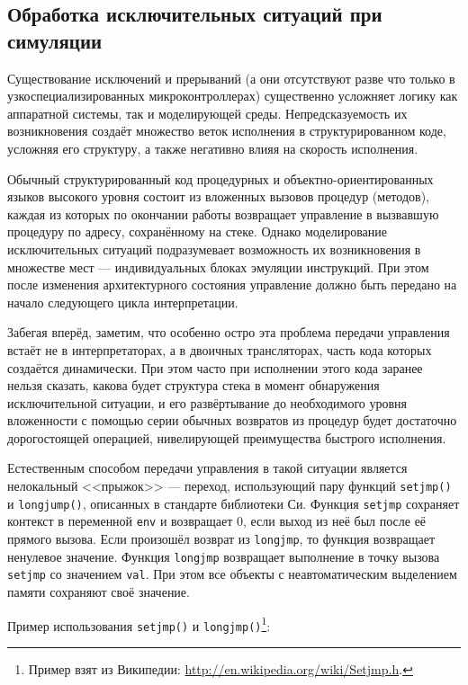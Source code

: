 \subsection[Обработка исключительных ситуаций]{Обработка исключительных ситуаций при симуляции}

Существование исключений и прерываний (а они отсутствуют разве что только в узкоспециализированных микроконтроллерах) существенно усложняет логику как аппаратной системы, так и моделирующей среды. Непредсказуемость их возникновения создаёт множество веток исполнения в структурированном коде, усложняя его структуру, а также негативно влияя на скорость исполнения.

Обычный структурированный код про\-це\-дур\-ных и объек\-тно-ори\-ен\-ти\-ро\-ван\-ных языков высокого уровня состоит из вложенных вызовов процедур (методов), каждая из которых по окончании работы возвращает управление в вызвавшую процедуру по адресу, сохранённому на стеке. Однако  моделирование исключительных ситуаций подразумевает возможность их возникновения в множестве мест --- индивидуальных блоках эмуляции инструкций. При этом после изменения архитектурного состояния управление должно быть передано на начало следующего цикла интерпретации.

Забегая вперёд, заметим, что особенно остро эта проблема передачи управления встаёт не в интерпретаторах, а в двоичных трансляторах, часть кода которых создаётся динамически. При этом часто при исполнении этого кода заранее нельзя сказать, какова будет структура стека в момент обнаружения исключительной ситуации, и его развёртывание до необходимого уровня вложенности с помощью серии обычных возвратов из процедур будет достаточно дорогостоящей операцией, нивелирующей преимущества быстрого исполнения.

Естественным способом передачи управления в такой ситуации является нелокальный <<прыжок>> --- переход, использующий пару функций \texttt{setjmp()} и \texttt{longjump()}, описанных в стандарте библиотеки Си. Функция \texttt{setjmp} сохраняет контекст в переменной \texttt{env} и возвращает 0, если выход из неё был после её прямого вызова. Если произошёл возврат из \texttt{longjmp}, то функция возвращает ненулевое значение.
Функция \texttt{longjmp} возвращает выполнение в точку вызова \texttt{setjmp} со значением \texttt{val}. При этом все объекты с неавтоматическим выделением памяти сохраняют своё значение.

Пример использования \texttt{setjmp()} и \texttt{longjmp()}\footnote{Пример взят из Википедии: \url{http://en.wikipedia.org/wiki/Setjmp.h}.}:

